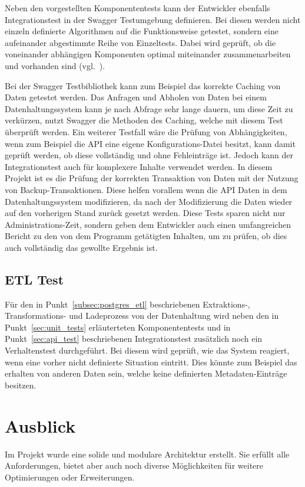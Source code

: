 Neben den vorgestellten Komponententests kann der Entwickler ebenfalls
Integrationstest in der Swagger Testumgebung definieren. Bei diesen werden
nicht einzeln definierte Algorithmen auf die Funktionsweise getestet, sondern
eine aufeinander abgestimmte Reihe von Einzeltests. Dabei wird geprüft, ob die
voneinander abhängigen Komponenten optimal miteinander zusammenarbeiten und
vorhanden sind (vgl.~\cite{Spring_Testing}).

Bei der Swagger Testbibliothek kann zum Beispiel das korrekte Caching von Daten
getestet werden. Das Anfragen und Abholen von Daten bei einem
Datenhaltungssystem kann je nach Abfrage sehr lange dauern, um diese Zeit zu
verkürzen, nutzt Swagger die Methoden des Caching, welche mit diesem Test
überprüft werden. Ein weiterer Testfall wäre die Prüfung von Abhängigkeiten,
wenn zum Beispiel die API eine eigene Konfigurations-Datei besitzt, kann damit
geprüft werden, ob diese vollständig und ohne Fehleinträge ist. Jedoch kann der
Integrationstest auch für komplexere Inhalte verwendet werden. In diesem
Projekt ist es die Prüfung der korrekten Transaktion von Daten mit der Nutzung
von Backup-Transaktionen. Diese helfen vorallem wenn die API Daten in dem
Datenhaltungssystem modifizieren, da nach der Modifizierung die Daten wieder
auf den vorherigen Stand zurück gesetzt werden. Diese Tests sparen nicht nur
Administrations-Zeit, sondern geben dem Entwickler auch einen umfangreichen
Bericht zu den von dem Programm getätigten Inhalten, um zu prüfen, ob dies auch
vollständig das gewollte Ergebnis ist.
\nl%

\section{ETL Test}
\label{sec:etl_test}
Für den in Punkt~\ref{subsec:postgres_etl} beschriebenen Extraktions-,
Transformations- und Ladeprozess von der Datenhaltung wird neben den
in Punkt~\ref{sec:unit_tests} erläuterteten Komponententests und
in Punkt~\ref{sec:api_test} beschriebenen Integrationstest zusätzlich
noch ein Verhaltenstest durchgeführt. Bei diesem wird geprüft, wie das
System reagiert, wenn eine vorher nicht definierte Situation eintritt.
Dies könnte zum Beispiel das erhalten von anderen Daten sein, welche keine
definierten Metadaten-Einträge besitzen.
\nl%

\chapter{Ausblick}
\label{chapter:ausblick}
Im Projekt wurde eine solide und modulare Architektur erstellt. Sie erfüllt
alle Anforderungen, bietet aber auch noch diverse Möglichkeiten für
weitere Optimierungen oder Erweiterungen.
\tm%

